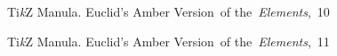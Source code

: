 \documentclass[a4paper,11pt]{article}
\begin{document}
\begin{figure}[ht]

  \centering

  \begin{tikzpicture}

























  \end{tikzpicture}

  \caption{Ti\textit{k}Z Manula. Euclid's Amber Version~of
    the~\textit{Elements},~10}

\end{figure}





\begin{figure}[ht]

  \centering

  \begin{tikzpicture}




























































  \end{tikzpicture}

  \caption{Ti\textit{k}Z Manula. Euclid's Amber Version~of
    the~\textit{Elements},~11}

\end{figure}
\end{document}
